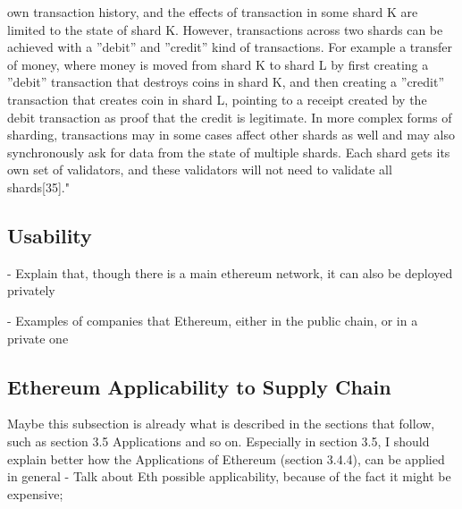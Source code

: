 own transaction history, and the effects of transaction in some shard K are limited to the
state of shard K. However, transactions across two shards can be achieved with a ”debit”
and ”credit” kind of transactions. For example a transfer of money, where money is moved
from shard K to shard L by first creating a ”debit” transaction that destroys coins in shard
K, and then creating a ”credit” transaction that creates coin in shard L, pointing to a receipt
created by the debit transaction as proof that the credit is legitimate. In more complex
forms of sharding, transactions may in some cases affect other shards as well and may also
synchronously ask for data from the state of multiple shards. Each shard gets its own set of
validators, and these validators will not need to validate all shards[35]."

\subsection{Usability}
- Explain that, though there is a main ethereum network, it can also be deployed privately

- Examples of companies that Ethereum, either in the public chain, or in a private one

\subsection{Ethereum Applicability to Supply Chain}
Maybe this subsection is already what is described in the sections that follow, such as section 3.5 Applications and so on. Especially in section 3.5, I should explain better how the Applications of Ethereum (section 3.4.4), can be applied in general
- Talk about Eth possible applicability, because of the fact it might be expensive;

